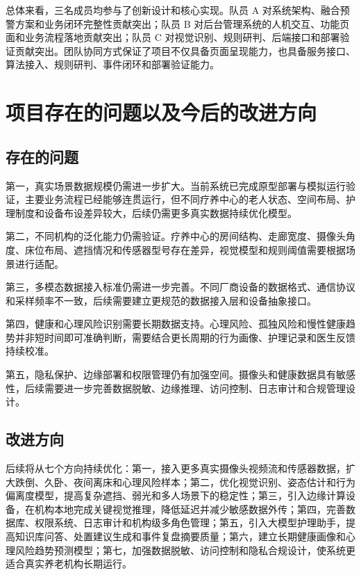 \documentclass[UTF8,a4paper,zihao=-4,fontset=fandol]{ctexart}
\begin{document}
总体来看，三名成员均参与了创新设计和核心实现。队员 A 对系统架构、融合预警方案和业务闭环完整性贡献突出；队员 B 对后台管理系统的人机交互、功能页面和业务流程落地贡献突出；队员 C 对视觉识别、规则研判、后端接口和部署验证贡献突出。团队协同方式保证了项目不仅具备页面呈现能力，也具备服务接口、算法接入、规则研判、事件闭环和部署验证能力。

\section{项目存在的问题以及今后的改进方向}

\subsection{存在的问题}

第一，真实场景数据规模仍需进一步扩大。当前系统已完成原型部署与模拟运行验证，主要业务流程已经能够连贯运行，但不同疗养中心的老人状态、空间布局、护理制度和设备布设差异较大，后续仍需更多真实数据持续优化模型。

第二，不同机构的泛化能力仍需验证。疗养中心的房间结构、走廊宽度、摄像头角度、床位布局、遮挡情况和传感器型号存在差异，视觉模型和规则阈值需要根据场景进行适配。

第三，多模态数据接入标准仍需进一步完善。不同厂商设备的数据格式、通信协议和采样频率不一致，后续需要建立更规范的数据接入层和设备抽象接口。

第四，健康和心理风险识别需要长期数据支持。心理风险、孤独风险和慢性健康趋势并非短时间即可准确判断，需要结合更长周期的行为画像、护理记录和医生反馈持续校准。

第五，隐私保护、边缘部署和权限管理仍有加强空间。摄像头和健康数据具有敏感性，后续需要进一步完善数据脱敏、边缘推理、访问控制、日志审计和合规管理设计。

\subsection{改进方向}

后续将从七个方向持续优化：第一，接入更多真实摄像头视频流和传感器数据，扩大跌倒、久卧、夜间离床和心理风险样本；第二，优化视觉识别、姿态估计和行为偏离度模型，提高复杂遮挡、弱光和多人场景下的稳定性；第三，引入边缘计算设备，在机构本地完成关键视觉推理，降低延迟并减少敏感数据外传；第四，完善数据库、权限系统、日志审计和机构级多角色管理；第五，引入大模型护理助手，提高知识库问答、处置建议生成和事件复盘摘要质量；第六，建立长期健康画像和心理风险趋势预测模型；第七，加强数据脱敏、访问控制和隐私合规设计，使系统更适合真实养老机构长期运行。
\end{document}

